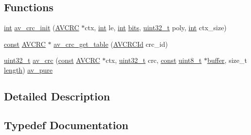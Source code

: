 \subsection*{Functions}
\begin{DoxyCompactItemize}
\item 
\hyperlink{xmltok_8h_a5a0d4a5641ce434f1d23533f2b2e6653}{int} \hyperlink{group__lavu__crc32_ga27f906ac7e618afdac0be18de678ac3d}{av\+\_\+crc\+\_\+init} (\hyperlink{group__lavu__crc32_gad7b1134679f68f2d4a52edaf1441e38f}{A\+V\+C\+RC} $\ast$ctx, \hyperlink{xmltok_8h_a5a0d4a5641ce434f1d23533f2b2e6653}{int} le, \hyperlink{xmltok_8h_a5a0d4a5641ce434f1d23533f2b2e6653}{int} \hyperlink{metrics_8c_a1eb8fc809d37cc6176f7f27374b063d0}{bits}, \hyperlink{lib-src_2ffmpeg_2win32_2stdint_8h_a6eb1e68cc391dd753bc8ce896dbb8315}{uint32\+\_\+t} poly, \hyperlink{xmltok_8h_a5a0d4a5641ce434f1d23533f2b2e6653}{int} ctx\+\_\+size)
\item 
\hyperlink{getopt1_8c_a2c212835823e3c54a8ab6d95c652660e}{const} \hyperlink{group__lavu__crc32_gad7b1134679f68f2d4a52edaf1441e38f}{A\+V\+C\+RC} $\ast$ \hyperlink{group__lavu__crc32_gabb35ea72fdeee2645e4e57cae225ac2b}{av\+\_\+crc\+\_\+get\+\_\+table} (\hyperlink{group__lavu__crc32_gab7717a9f1179a5ac8516982f9f2997d2}{A\+V\+C\+R\+C\+Id} crc\+\_\+id)
\item 
\hyperlink{lib-src_2ffmpeg_2win32_2stdint_8h_a6eb1e68cc391dd753bc8ce896dbb8315}{uint32\+\_\+t} \hyperlink{group__lavu__crc32_gae0feb73f66306494315f07de7ab57f80}{av\+\_\+crc} (\hyperlink{getopt1_8c_a2c212835823e3c54a8ab6d95c652660e}{const} \hyperlink{group__lavu__crc32_gad7b1134679f68f2d4a52edaf1441e38f}{A\+V\+C\+RC} $\ast$ctx, \hyperlink{lib-src_2ffmpeg_2win32_2stdint_8h_a6eb1e68cc391dd753bc8ce896dbb8315}{uint32\+\_\+t} crc, \hyperlink{getopt1_8c_a2c212835823e3c54a8ab6d95c652660e}{const} \hyperlink{lib-src_2ffmpeg_2win32_2stdint_8h_a9a941819355e6f658991890ff66b4b0e}{uint8\+\_\+t} $\ast$\hyperlink{structbuffer}{buffer}, size\+\_\+t \hyperlink{test__lib_f_l_a_c_2format_8c_ac94dc16b22556ba5fa815655f27442da}{length}) \hyperlink{attributes_8h_adc7fd5bb40d84900a3a30ef3318020c2}{av\+\_\+pure}
\end{DoxyCompactItemize}


\subsection{Detailed Description}


\subsection{Typedef Documentation}
